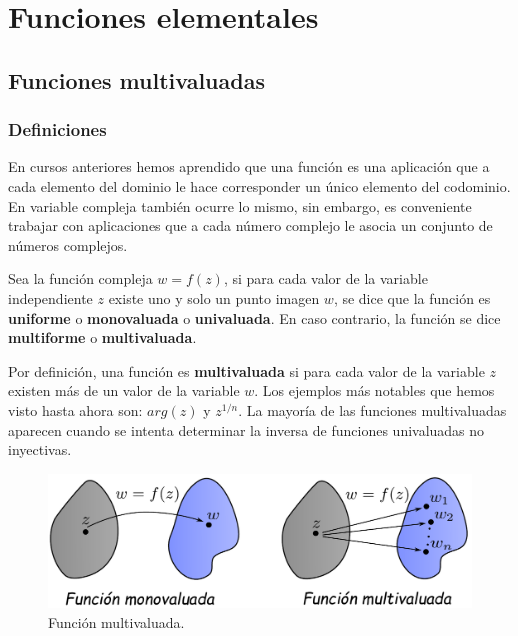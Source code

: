 \chapter{Funciones elementales}

\section{Funciones multivaluadas} \label{Multivaluadas}

\subsection{Definiciones}

En cursos anteriores hemos aprendido que una función es una aplicación que a cada elemento del dominio le hace corresponder un único elemento del codominio. En variable compleja también ocurre lo mismo, sin embargo, es conveniente trabajar con aplicaciones que a cada número complejo le asocia un conjunto de números complejos.

\begin{defi}
Sea la función compleja $w = f(z)$, si para cada valor de la variable independiente $z$ existe uno y solo un punto imagen $w$, se dice que la función es \textbf{uniforme} o \textbf{monovaluada} o \textbf{univaluada}. En caso contrario, la función se dice \textbf{multiforme} o \textbf{multivaluada}.
\end{defi}

Por definición, una función es \textbf{multivaluada} si para cada valor de la variable $z$ existen más de un valor de la variable $w$. Los ejemplos más notables que hemos visto hasta ahora son: $arg(z)$ y $z^{1/n}$. La mayoría de las funciones multivaluadas aparecen cuando se intenta determinar la inversa de funciones univaluadas no inyectivas.

\begin{figure}[H]
    \centering
    \includegraphics[scale=0.6]{Figuras/Funciones_Multivaluadas.pdf}
    \caption{Función multivaluada.}
    \label{MultiF}
\end{figure}

